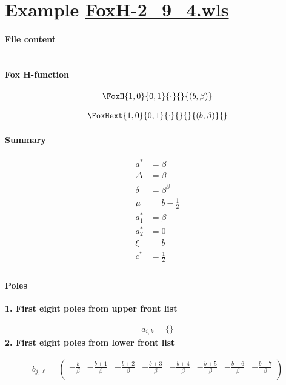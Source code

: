 \documentclass[11pt]{article}
\begin{document}
\section{Example \url{FoxH-2_9_4.wls}}

\paragraph{File content}

\inputminted{text}{FoxH-2_9_4.wls}

\paragraph{Fox H-function}

\begin{align*}
  \FoxH
    {1,0}
    {0,1}
    {\cdot}
    {}
    {\left(b, \beta\right)}
\end{align*}

\begin{align*}
  \FoxHext
    {1,0}
    {0,1}
    {\cdot}
    {}
    {}
    {\left(b, \beta\right)}
    {}
\end{align*}

\paragraph{Summary}

\begin{align*}
  a^*    & = \beta \\
  \Delta & = \beta \\
  \delta & = \beta ^{\beta } \\
  \mu    & = b-\frac{1}{2} \\
  a_1^*  & = \beta \\
  a_2^*  & = 0 \\
  \xi    & = b \\
  c^*    & = \frac{1}{2} \\
\end{align*}

\paragraph{Poles}

\noindent\textbf{1. First eight poles from upper front list}

\begin{align*}
  a_{i,k} = 
  \{\}
\end{align*}
\noindent\textbf{2. First eight poles from lower front list}

\begin{align*}
  b_{j,\ell} = 
  \left(
\begin{array}{cccccccc}
 -\frac{b}{\beta } & -\frac{b+1}{\beta } & -\frac{b+2}{\beta } & -\frac{b+3}{\beta } & -\frac{b+4}{\beta } & -\frac{b+5}{\beta } & -\frac{b+6}{\beta } & -\frac{b+7}{\beta } \\
\end{array}
\right)
\end{align*}



\printbibliography[title={References}]
\end{document}
